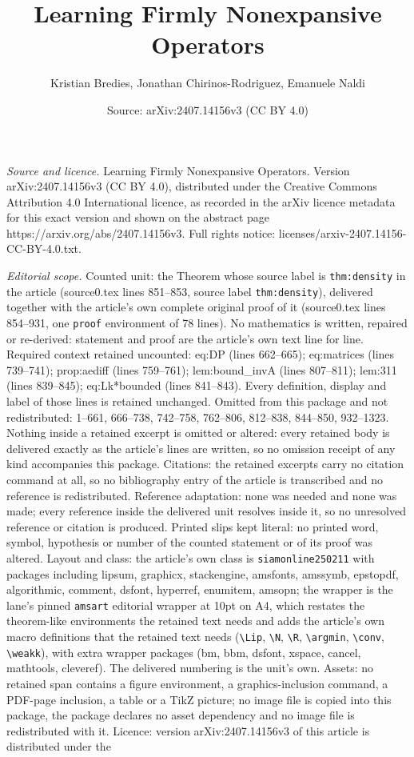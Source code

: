 \documentclass[10pt,a4paper]{amsart}
\title[Learning Firmly Nonexpansive Operators]{Learning Firmly Nonexpansive Operators}
\author{Kristian Bredies, Jonathan Chirinos-Rodriguez, Emanuele Naldi}
\date{Source: arXiv:2407.14156v3 (CC BY 4.0)}
\begin{document}
\maketitle

\noindent\emph{Source and licence.} Learning Firmly Nonexpansive Operators. Version arXiv:2407.14156v3 (CC BY 4.0), distributed under the Creative Commons Attribution 4.0 International licence, as recorded in the arXiv licence metadata for this exact version and shown on the abstract page https://arxiv.org/abs/2407.14156v3. Full rights notice: licenses/arxiv-2407.14156-CC-BY-4.0.txt.\par\smallskip

\noindent\textit{Editorial scope.} Counted unit: the Theorem whose source label is \texttt{thm:density} in the article (source0.tex lines 851--853, source label \texttt{thm:density}), delivered together with the article's own complete original proof of it (source0.tex lines 854--931, one \texttt{proof} environment of 78 lines). No mathematics is written, repaired or re-derived: statement and proof are the article's own text line for line. Required context retained uncounted: eq:DP (lines 662--665); eq:matrices (lines 739--741); prop:aediff (lines 759--761); lem:bound\_invA (lines 807--811); lem:311 (lines 839--845); eq:Lk*bounded (lines 841--843). Every definition, display and label of those lines is retained unchanged. Omitted from this package and not redistributed: 1--661, 666--738, 742--758, 762--806, 812--838, 844--850, 932--1323. Nothing inside a retained excerpt is omitted or altered: every retained body is delivered exactly as the article's lines are written, so no omission receipt of any kind accompanies this package. Citations: the retained excerpts carry no citation command at all, so no bibliography entry of the article is transcribed and no reference is redistributed. Reference adaptation: none was needed and none was made; every reference inside the delivered unit resolves inside it, so no unresolved reference or citation is produced. Printed slips kept literal: no printed word, symbol, hypothesis or number of the counted statement or of its proof was altered. Layout and class: the article's own class is \texttt{siamonline250211} with packages including lipsum, graphicx, stackengine, amsfonts, amssymb, epstopdf, algorithmic, comment, dsfont, hyperref, enumitem, amsopn; the wrapper is the lane's pinned \texttt{amsart} editorial wrapper at 10pt on A4, which restates the theorem-like environments the retained text needs and adds the article's own macro definitions that the retained text needs (\texttt{\textbackslash Lip}, \texttt{\textbackslash N}, \texttt{\textbackslash R}, \texttt{\textbackslash argmin}, \texttt{\textbackslash conv}, \texttt{\textbackslash weakk}), with extra wrapper packages (bm, bbm, dsfont, xspace, cancel, mathtools, cleveref). The delivered numbering is the unit's own. Assets: no retained span contains a figure environment, a graphics-inclusion command, a PDF-page inclusion, a table or a TikZ picture; no image file is copied into this package, the package declares no asset dependency and no image file is redistributed with it. Licence: version arXiv:2407.14156v3 of this article is distributed under the 
\end{document}

